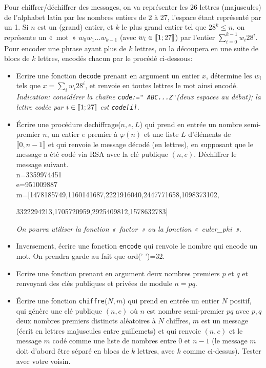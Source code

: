\documentclass[11pt,a4paper]{article}
\begin{document}
Pour chiffrer/déchiffrer des messages, on va représenter les 26 lettres (majuscules) de l'alphabet latin par les nombres entiers de 2 à 27, l'espace étant représenté par un 1. Si $n$ est un (grand) entier, et $k$ le plus grand entier tel que $28^{k} \leqslant n$, on représente un «~mot~» $w_0 w_1 \ldots w_{k-1}$ (avec $w_i \in \llbracket 1;27 \rrbracket$) par l'entier $\sum_{i=0}^{k-1} w_i 28^i$. Pour encoder une phrase ayant plus de $k$ lettres, on la découpera en une suite de blocs de $k$ lettres, encodés chacun par le procédé ci-dessous:
\begin{itemize}
\item[•] Ecrire une fonction \texttt{decode} prenant en argument un entier $x$, détermine les $w_i$ tels que $ x=\sum_{i}w_i 28^i$, et renvoie en toutes lettres le mot ainsi encodé.\\ 
\textit{Indication: considérer la chaîne \texttt{code:="  ABC...Z"}(deux espaces au début); la lettre codée par $i \in \llbracket 1;27 \rrbracket  $ est \texttt{code[i]}.}
\item[•] Écrire une procédure dechiffrage($n,e,L$) qui prend en entrée un nombre semi-premier $n$, un entier $e$ premier à $\varphi(n)$ et une liste $L$ d'éléments de $\llbracket 0,n-1\rrbracket$ et qui renvoie le message décodé (en lettres), en supposant que le message a été codé via RSA avec la clé publique $(n,e)$. Déchiffrer le message suivant.\\
n=3359974451\\
e=951009887\\
m=$[$1478185749,1160141687,2221916040,2447771658,1098373102,

3322294213,1705720959,2925409812,1578632783$]$


\textit{On pourra utiliser la fonction «~factor~» ou la fonction «~euler\_phi~».}
\item[•] Inversement, écrire une fonction \texttt{encode} qui renvoie le nombre qui encode un mot. On prendra garde au fait que ord(' ')=32.
\item[•] Ecrire une fonction prenant en argument deux nombres premiers $p$ et $q$ et renvoyant des clés publiques et privées de module $n=pq$.
\item[•] Écrire une fonction \texttt{chiffre}($N,m$) qui prend en entrée un entier $N$ positif, qui génère une clé publique $(n,e)$ où $n$ est  nombre semi-premier $pq$ avec $p,q$ deux nombres premiers distincts aléatoires à $N$ chiffres, $m$ est un message (écrit en lettres majuscules entre guillemets) et qui  renvoie $(n,e)$ et le message $m$ codé comme une liste   de nombres entre $0$ et $n-1$ (le message $m$ doit d'abord être séparé en blocs de $k$ lettres, avec $k$ comme ci-dessus). Tester avec votre voisin.




\end{itemize}
\end{document}
